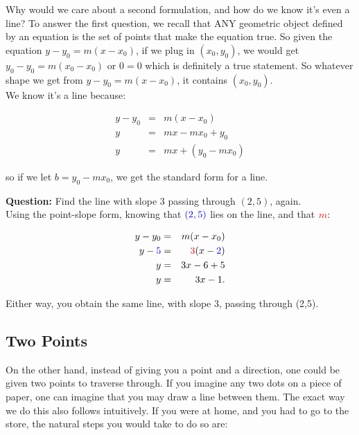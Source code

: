Why would we care about a second formulation, and how do we know it's even a line?  To answer the first question, we recall that ANY geometric object defined by an equation is the set of points that make the equation true.  So given the equation $y-y_0=m(x-x_0)$, if we plug in $(x_0, y_0)$, we would get $y_0-y_0=m(x_0-x_0)$ or $0=0$ which is definitely a true statement.  So whatever shape we get from $y-y_0=m(x-x_0)$, it contains $(x_0, y_0)$.\\

We know it's a line because:

\begin{eqnarray*}
y-y_0&=&m(x-x_0)\\
y&=&mx-mx_0+y_0\\
y&=&mx+(y_0-mx_0)
\end{eqnarray*}

so if we let $b=y_0-mx_0$, we get the standard form for a line.


\begin{example}\label{Example:PandSagain}
\textbf{Question:} Find the line with slope 3 passing through $(2,5)$, again.\\

Using the point-slope form, knowing that $\textcolor{blue}{(2,5)}$ lies on the line, and that $\textcolor{red}{m}$:

\begin{eqnarray*}
y-y_0&=&m(x-x_0)\\
y-\textcolor{blue}{5}&=&\textcolor{red}{3}(x-\textcolor{blue}{2})\\
y&=&3x-6+5\\
y&=&3x-1.
\end{eqnarray*}

Either way, you obtain the same line, with slope 3, passing through (2,5).

\end{example}

\subsection{Two Points}

On the other hand, instead of giving you a point and a direction, one could be given two points to traverse through.  If you imagine any two dots on a piece of paper, one can imagine that you may draw a line between them.  The exact way we do this also follows intuitively.  If you were at home, and you had to go to the store, the natural steps you would take to do so are:

